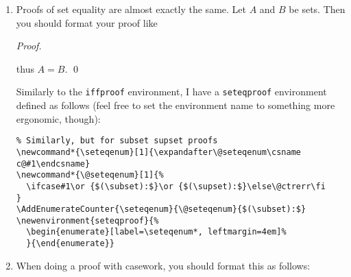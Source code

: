 \documentclass{fkpset}
\begin{document}
\begin{enumerate}[label=(\arabic*)]
\begin{lstlisting}
\AddEnumerateCounter{\iffenum}{\@iffenum}{$(\Rightarrow):$}
\newenvironment{iffproof}{%
  \begin{enumerate}[label=\iffenum*, leftmargin=4em]%
  }{\end{enumerate}}\end{lstlisting}
  With this, creating the iff portion of the proof above was as simple as
  \begin{lstlisting}
\begin{iffproof}
  \item Suppose $A$. Then [\ldots lots of math happening here!\ \ldots], hence
    $B$. \cmark
  \item Suppose $B$. Then [\ldots also lots of math happening here! \ldots],
    therefore $A$.
\end{iffproof}\end{lstlisting}
  Where \verb|\cmark| requires the \texttt{pifont} package and is defined
  by\\
  \verb|\newcommand{\cmark}{\text{\ding{51}}}|.
\item Proofs of set equality are almost exactly the same. Let $A$ and $B$ be
  sets. Then you should format your proof like
  \begin{leftbar}
    \emph{Proof.}
    thus $A = B$. \qed
  \end{leftbar}
  Similarly to the \texttt{iffproof} environment, I have a
  \texttt{seteqproof} environment defined as follows (feel free to set the
  environment name to something more ergonomic, though):
  \begin{lstlisting}
% Similarly, but for subset supset proofs
\newcommand*{\seteqenum}[1]{\expandafter\@seteqenum\csname c@#1\endcsname}
\newcommand*{\@seteqenum}[1]{%
  \ifcase#1\or {$(\subset):$}\or {$(\supset):$}\else\@ctrerr\fi
}
\AddEnumerateCounter{\seteqenum}{\@seteqenum}{$(\subset):$}
\newenvironment{seteqproof}{%
  \begin{enumerate}[label=\seteqenum*, leftmargin=4em]%
  }{\end{enumerate}}\end{lstlisting}
\item When doing a proof with casework, you should format this as follows:

\end{enumerate}
\end{document}
